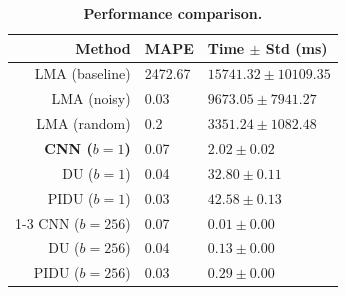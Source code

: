 \begin{table}[t]
\centering
\small
\caption{\textbf{Performance comparison.}}
\label{tab:timings_case1}
\begin{tabular}{rll}
\toprule
\textbf{Method} & \textbf{MAPE} & \textbf{Time $\pm$ Std (ms)} \\
\midrule
LMA (baseline) & 2472.67 & $15741.32 \pm 10109.35$ \\
LMA (noisy) & 0.03 & $9673.05 \pm 7941.27$ \\
LMA (random) & 0.2 & $3351.24 \pm 1082.48$ \\
\textbf{CNN ($b=1$)} & 0.07 & $\mathbf{2.02 \pm 0.02}$ \\
DU ($b=1$) & 0.04 & $32.80 \pm 0.11$ \\
PIDU ($b=1$) & 0.03 & $42.58 \pm 0.13$ \\
\cmidrule{1-3}
CNN ($b=256$) & 0.07 & $0.01 \pm 0.00$ \\
DU ($b=256$) & 0.04 & $0.13 \pm 0.00$ \\
PIDU ($b=256$) & 0.03 & $0.29 \pm 0.00$ \\
\bottomrule
\end{tabular}
\end{table}
